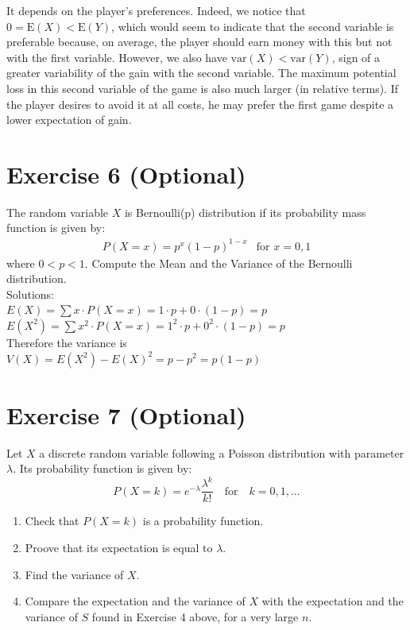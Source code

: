 \documentclass[12pt,thmsa]{article}\usepackage[]{graphicx}\usepackage[]{color}
\begin{document}
\begin{enumerate}
It depends on the player's preferences. Indeed, we notice that $ 0 = \mbox {E} (X) <\mbox {E} (Y) $, which would seem to indicate that the second variable is preferable because, on average, the player should earn money with this but not with the first variable. However, we also have $ \mbox {var} (X) <\mbox {var} (Y) $, sign of a greater variability of the gain with the second variable. The maximum potential loss in this second variable of the game is also much larger (in relative terms). If the player desires to avoid it at all costs, he may prefer the first game despite a lower expectation of gain.

\end{enumerate}


\section*{Exercise 6 (Optional)}
The random variable $ X $ is Bernoulli(p) distribution if its probability mass function is given by:
\begin{align*}
P(X=x)=p^{x}(1-p)^{1-x} & \text{for } x=0,1
\end{align*}
where $ 0<p<1 $.
Compute the Mean and the Variance of the Bernoulli distribution.\\

\noindent Solutions:\\
\noindent $ E(X)= \sum x\cdot P(X=x)=1\cdot p+0\cdot (1-p)=p $\\
$ E(X^{2})=\sum x^{2}\cdot P(X=x)=1^{2}\cdot p+0^{2}\cdot (1-p)=p $\\
Therefore the variance is \\
$ V(X)=E(X^{2})-E(X)^{2}=p-p^{2}=p(1-p) $\\






\section*{Exercise 7 (Optional)}

Let $X$ a discrete random variable following a Poisson distribution with parameter $\lambda$. Its probability function is given by:
\begin{equation*}
P(X=k)=e^{-\lambda} \frac{\lambda^{k}}{k!} \quad \text{for} \quad k=0,1,...
\end{equation*}
\begin{enumerate}
  \item Check that $P(X=k)$ is a probability function.
  \item Proove that its expectation is equal to $\lambda$.
  \item Find the variance of $X$.
  \item Compare the expectation and the variance of $X$ with the expectation and the variance of $S$ found in Exercise 4 above, for a very large $n$.
\end{enumerate}
\end{document}
